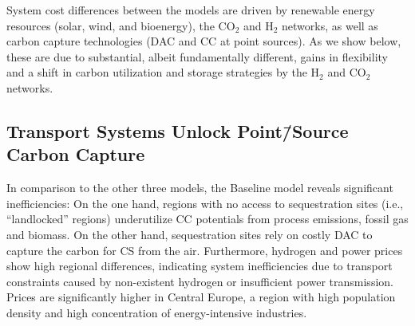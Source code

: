 \documentclass[twocolumn]{article}
\newcommand{\carbon}{CO$_2$}
\newcommand{\hydrogen}{H$_2$}
\newcommand{\modBase}{Baseline model}
\begin{document}
System cost differences between the models are driven by renewable energy resources (solar, wind, and bioenergy), the \carbon{} and \hydrogen{} networks, as well as carbon capture technologies (DAC and CC at point sources).
As we show below, these are due to substantial, albeit fundamentally different, gains in flexibility and a shift in carbon utilization and storage strategies by the \hydrogen{} and \carbon{} networks.

\subsection*{Transport Systems Unlock Point\=/Source Carbon Capture}

In comparison to the other three models, the \modBase{} reveals significant inefficiencies: On the one hand, regions with no access to sequestration sites (i.e., ``landlocked'' regions) underutilize CC potentials from process emissions, fossil gas and biomass. On the other hand, sequestration sites rely on costly DAC to capture the carbon for CS from the air. Furthermore, hydrogen and power prices show high regional differences, indicating system inefficiencies due to transport constraints caused by non-existent hydrogen or insufficient power transmission. Prices are significantly higher in Central Europe, a region with high population density and high concentration of energy-intensive industries.
\end{document}
